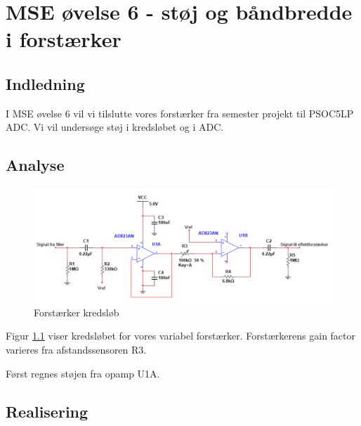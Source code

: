 \documentclass[a4paper, 11pt, articel,oneside,openany]{memoir} %
\begin{document}
	
\chapter{MSE øvelse 6 - støj og båndbredde i forstærker}

\section{Indledning}
I MSE øvelse 6 vil vi tilslutte vores forstærker fra semester projekt til PSOC5LP ADC. Vi vil undersøge støj i kredsløbet og i ADC.


\section{Analyse}

\begin{figure}[ht] %
	\centering
	\includegraphics[width=\textwidth]{figure/kreds1}
	\caption{Forstærker kredsløb}
	\label{fig:kreds1}
\end{figure}
Figur \ref{fig:kreds1} viser kredsløbet for vores variabel forstærker. Forstærkerens gain factor varieres fra afstandssensoren R3.

Først regnes støjen fra opamp U1A.




\section{Realisering}
\end{document}
